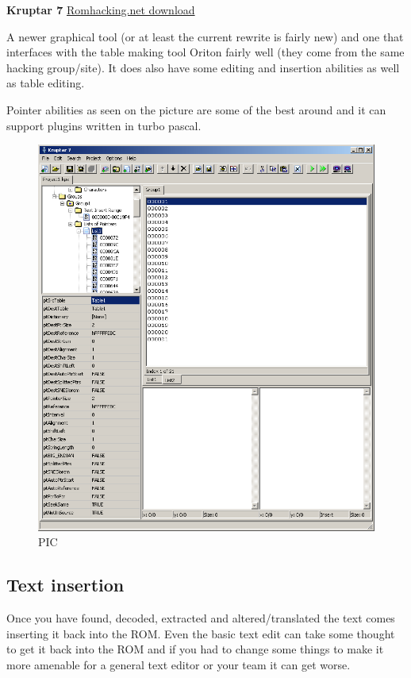 \documentclass[
]{book}
\begin{document}
\textbf{Kruptar 7} \href{http://www.romhacking.net/utilities/612/}{Romhacking.net download}

A newer graphical tool (or at least the current rewrite is fairly new) and one that interfaces with the table making tool Oriton fairly well (they come from the same hacking group/site). It does also have some editing and insertion abilities as well as table editing.

Pointer abilities as seen on the picture are some of the best around and it can support plugins written in turbo pascal.

\begin{figure}
\centering
\includegraphics{images/133_home_fast6191_romhackingguide_unrenamed_fil___mhackguidetextextractionkruptar7_1_tofinish.png}
\caption{PIC}
\end{figure}

\hypertarget{text-insertion}{%
\subsection{Text insertion}\label{text-insertion}}

Once you have found, decoded, extracted and altered/translated the text comes inserting it back into the ROM. Even the basic text edit can take some thought to get it back into the ROM and if you had to change some things to make it more amenable for a general text editor or your team it can get worse.
\end{document}
